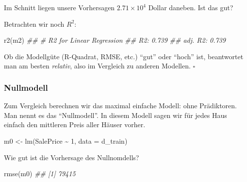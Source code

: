 \documentclass[
  letterpaper,
]{scrbook}
\newenvironment{Shaded}{\begin{snugshade}}{\end{snugshade}}
\newcommand{\AttributeTok}[1]{\textcolor[rgb]{0.40,0.45,0.13}{#1}}
\newcommand{\DecValTok}[1]{\textcolor[rgb]{0.68,0.00,0.00}{#1}}
\newcommand{\DocumentationTok}[1]{\textcolor[rgb]{0.37,0.37,0.37}{\textit{#1}}}
\newcommand{\FunctionTok}[1]{\textcolor[rgb]{0.28,0.35,0.67}{#1}}
\newcommand{\NormalTok}[1]{\textcolor[rgb]{0.00,0.23,0.31}{#1}}
\newcommand{\OtherTok}[1]{\textcolor[rgb]{0.00,0.23,0.31}{#1}}
\newcommand{\SpecialCharTok}[1]{\textcolor[rgb]{0.37,0.37,0.37}{#1}}
\theoremstyle{definition}
\theoremstyle{definition}
\theoremstyle{definition}
\theoremstyle{remark}
\begin{document}
Im Schnitt liegen unsere Vorhersagen \ensuremath{2.71\times 10^{4}}
Dollar daneben. Ist das gut?

Betrachten wir noch \(R^2\):

\begin{Shaded}
\begin{Highlighting}[]
\FunctionTok{r2}\NormalTok{(m2)}
\DocumentationTok{\#\# \# R2 for Linear Regression}
\DocumentationTok{\#\#        R2: 0.739}
\DocumentationTok{\#\#   adj. R2: 0.739}
\end{Highlighting}
\end{Shaded}

\begin{tcolorbox}[enhanced jigsaw, left=2mm, toptitle=1mm, toprule=.15mm, rightrule=.15mm, leftrule=.75mm, breakable, colbacktitle=quarto-callout-note-color!10!white, colback=white, coltitle=black, bottomtitle=1mm, opacityback=0, title=\textcolor{quarto-callout-note-color}{\faInfo}\hspace{0.5em}{Hinweis}, colframe=quarto-callout-note-color-frame, arc=.35mm, opacitybacktitle=0.6, bottomrule=.15mm, titlerule=0mm]

Ob die Modellgüte (R-Quadrat, RMSE, etc.) ``gut'' oder ``hoch'' ist,
beantwortet man am besten \emph{relativ}, also im Vergleich zu anderen
Modellen. \(\square\)

\end{tcolorbox}

\subsubsection{Nullmodell}\label{nullmodell}

Zum Vergleich berechnen wir das maximal einfache Modell: ohne
Prädiktoren. Man nennt es das ``Nullmodell''. In diesem Modell sagen wir
für jedes Haus einfach den mittleren Preis aller Häuser vorher.

\begin{Shaded}
\begin{Highlighting}[]
\NormalTok{m0 }\OtherTok{\textless{}{-}} \FunctionTok{lm}\NormalTok{(SalePrice }\SpecialCharTok{\textasciitilde{}} \DecValTok{1}\NormalTok{, }\AttributeTok{data =}\NormalTok{ d\_train)}
\end{Highlighting}
\end{Shaded}

Wie gut ist die Vorhersage des Nullnomdells?

\begin{Shaded}
\begin{Highlighting}[]
\FunctionTok{rmse}\NormalTok{(m0)}
\DocumentationTok{\#\# [1] 79415}
\end{Highlighting}
\end{Shaded}
\end{document}
